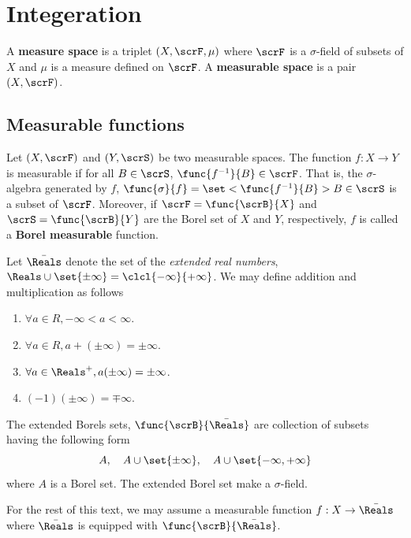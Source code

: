 \chapter{Integeration}
\begin{definition}
    A \textbf{measure space} is a triplet \((X,\scrF,\mu)\) where \(\scrF\) is a \(\sigma\)-field of subsets of \(X\) and \(\mu\) is a measure defined on \(\scrF\). A \textbf{measurable space} is a pair \((X,\scrF)\).
\end{definition}
\section{Measurable functions}
Let \((X,\scrF)\) and \((Y,\scrS)\) be two measurable spaces. The function \(f:X\to Y\) is measurable if for all \(B \in \scrS\), \(\func{f^{-1}}{B} \in \scrF\). That is, the \(\sigma\)-algebra generated by \(f\), \(\func{\sigma}{f} = \set<\func{f^{-1}}{B}>{B \in \scrS}\) is a subset of \(\scrF\). Moreover, if \(\scrF = \func{\scrB}{X}\) and \(\scrS = \func{\scrB}{Y}\) are the Borel set of \(X\) and \(Y\), respectively, \(f\) is called a \textbf{Borel measurable} function. 

Let \(\bar{\Reals}\) denote the set of the \textit{extended real numbers}, \(\Reals \cup \set{\pm \infty} = \clcl{-\infty}{+\infty}\). We may define addition and multiplication as follows 
\begin{enumerate}
    \item \(\forall a \in R, -\infty < a < \infty\).
    \item \(\forall a \in R, a + (\pm \infty) = \pm \infty\).
    \item \(\forall a \in \Reals^+, a(\pm \infty) = \pm \infty\).
    \item \((-1)(\pm \infty) = \mp \infty\).
\end{enumerate}
The extended Borels sets, \(\func{\scrB}{\bar{\Reals}}\) are collection of subsets having the following form 
\begin{equation*}
    A, \quad A \cup \set{\pm \infty}, \quad A \cup \set{-\infty, + \infty}
\end{equation*}
where \(A\) is a Borel set. The extended Borel set make a \(\sigma\)-field. 

For the rest of this text, we may assume a measurable function \(f: X \to \bar{\Reals}\) where \(\bar{\Reals}\) is equipped with \(\func{\scrB}{\bar{\Reals}}\). 

